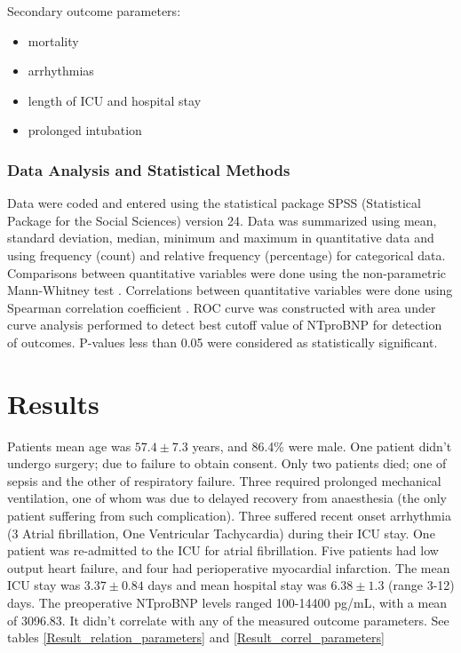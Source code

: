 \documentclass[14pt,a4paper,onecolumn]{extarticle}
\begin{document}
Secondary outcome parameters:
    \begin{itemize}
        \item mortality
        \item arrhythmias
        \item length of ICU and hospital stay
        \item prolonged intubation
    \end{itemize}

\subsubsection{Data Analysis and Statistical Methods}
Data were coded and entered using the statistical package SPSS (Statistical Package for the Social Sciences) version 24. Data was summarized using mean, standard deviation, median, minimum and maximum in quantitative data and using frequency (count) and relative frequency (percentage) for categorical data. Comparisons between quantitative variables were done using the non-parametric Mann-Whitney test \citep{Chan_a_2003}. Correlations between quantitative variables were done using Spearman correlation coefficient \citep{Chan_b_2003}.  ROC curve was constructed with area under curve analysis performed to detect best cutoff value of NTproBNP for detection of outcomes. P-values less than 0.05 were considered as statistically significant.

\clearpage
\section{Results}

Patients mean age was $57.4\pm7.3$ years, and 86.4\% were male.  One patient didn't undergo surgery; due to failure to obtain consent. Only two patients died; one of sepsis and the other of respiratory failure. Three required prolonged mechanical ventilation, one of whom was due to delayed recovery from anaesthesia (the only patient suffering from such complication). Three suffered recent onset arrhythmia (3 Atrial fibrillation, One Ventricular Tachycardia) during their ICU stay. One patient was re-admitted to the ICU for atrial fibrillation.  Five patients had low output heart failure, and four had perioperative myocardial infarction. The mean ICU stay was $3.37\pm0.84$ days and mean hospital stay was $6.38\pm1.3$ (range 3-12) days.  The preoperative NTproBNP levels ranged 100-14400 pg/mL, with a mean of 3096.83. It didn't correlate with any of the measured outcome parameters. See tables \ref{Result_relation_parameters} and \ref{Result_correl_parameters}
\end{document}
